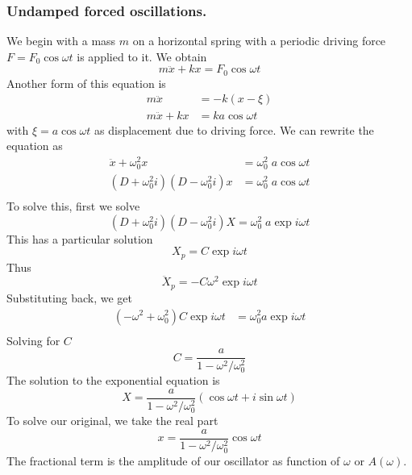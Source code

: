 \documentclass[../../../main.tex]{subfiles}
\begin{document}
\subsubsection{Undamped forced oscillations.} We begin with a mass $m$ on a horizontal spring with a periodic driving force $F = F_0 \cos \omega t$ is applied to it. We obtain
\begin{equation*}
    m\ddot{x}+kx=F_0 \cos \omega t
\end{equation*}
Another form of this equation is 
\begin{align*}
    m\ddot{x}&=-k(x-\xi)\\
    m\ddot{x}+kx&=ka \cos \omega t
\end{align*}
with $\xi=a \cos \omega t$ as displacement due to driving force. We can rewrite the equation as
\begin{align*}
    \ddot{x}+\omega_0^2x&=\omega_0^2\;a \cos \omega t\\
    (D+\omega_0^2i)(D-\omega_0^2i)x&=\omega_0^2\;a\cos \omega t\\
\end{align*}
To solve this, first we solve 
\begin{equation*}
    (D+\omega_0^2i)(D-\omega_0^2i)X=\omega_0^2\;a\exp i\omega t
\end{equation*}
This has a particular solution
\begin{equation*}
    X_p=C\exp{i\omega t}
\end{equation*}
Thus
\begin{equation*}
    \ddot{X}_p=-C\omega^2\exp{i\omega t}
\end{equation*}
Substituting back, we get
\begin{align*}
    (-\omega^2+\omega_0^2)C\exp{i\omega t}&=\omega_0^2a\exp{i\omega t}\\
\end{align*}
Solving for $C$
\begin{equation*}
    C=\frac{a}{1-\omega^2/\omega_0^2}
\end{equation*}
The solution to the exponential equation is 
\begin{equation*}
    X=\frac{a}{1-\omega^2/\omega_0^2}(\cos\omega t+i\sin \omega t)
\end{equation*}
To solve our original, we take the real part 
\begin{equation*}
    x=\frac{a}{1-\omega^2/\omega_0^2}\cos\omega t
\end{equation*}
The fractional term is the amplitude of our oscillator as function of $\omega$ or $A(\omega)$.
\end{document}
